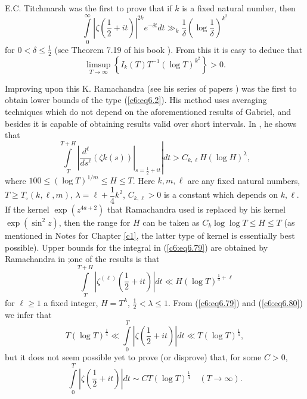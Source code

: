 E.C. Titchmarsh was the first to prove that if $k$ is a fixed natural
number, then 
$$
\int\limits^{\infty}_0 \left|\zeta \left(\frac{1}{2} + it
\right)\right|^{2k} e^{-\delta t} dt \gg_k \frac{1}{\delta} \left(\log
\frac{1}{\delta} \right)^{k^2} 
$$
for $0 < \delta \leq \frac{1}{2}$ (see Theorem 7.19 of his book
\cite{Titchmarsh1}). From this it is easy to deduce that  
$$
\limsup\limits_{T \to \infty} \left\{I_k (T) T^{-1} (\log
T)^{k^2}\right\} > 0. 
$$

Improving upon this K. Ramachandra (see his series of papers
\cite{Ramachandra3}) was the first to obtain lower bounds of the type
(\ref{c6:eq6.2}). His method uses averaging techniques which do not
depend on the aforementioned results of Gabriel, and besides it is
capable of obtaining results valid over short intervals. In \cite[Part
II]{Ramachandra3}, he shows that 
\begin{equation} 
\int\limits^{T+H}_T \left. \left|\frac{d^\ell}{ds^{\ell}}
(\zeta{k}(s)) \right|_{s = \frac{1}{2} +it} \right| dt > C_{k,\ell} H
(\log H)^{\lambda},\label{c6:eq6.79} 
\end{equation}
where $100 \leq (\log T)^{1/m} \leq H \leq T$. Here $k, m,\ell$ are
any fixed natural numbers, $T \geq T_\circ (k,\ell,m)$, $\lambda =
\ell + \dfrac{1}{4} k^2$, $C_{k,\ell} > 0$ is a constant which depends
on $k,\ell$. If the kernel $\exp (z^{4a+2})$ that Ramachandra used  is
replaced by his kernel $\exp (\sin^2 z)$, then the range for $H$ can
be taken as $C_k \log \log T \leq H \leq T$ (as mentioned in Notes for
Chapter \ref{c1}, the latter type of kernel is essentially best
possible). Upper bounds for the integral in (\ref{c6:eq6.79}) are
obtained by Ramachandra in \cite[Part
  III]{Ramachandra3};\pageoriginale one of the results is that 
\begin{equation}
\int\limits^{T+H}_T \left|\zeta^{(\ell)} \left(\frac{1}{2} + it
\right)\right|dt \ll H (\log T)^{\frac{1}{4}+ \ell}
\label{c6:eq6.80} 
\end{equation}
for $\ell \geq 1$ a fixed integer, $H = T^{\lambda}$, $\frac{1}{2} <
\lambda \leq 1$. From (\ref{c6:eq6.79}) and (\ref{c6:eq6.80}) we infer
that 
$$
T(\log T)^{\frac{1}{4}} \ll \int\limits^T_0 \left|\zeta
\left(\frac{1}{2} + it \right)\right|dt\ll T(\log T)^{\frac{1}{4}}, 
$$
but it does not seem possible yet to prove (or disprove) that, for
some $C>0$, 
$$
\int\limits^T_0 \left|\zeta \left(\frac{1}{2} + it \right)\right| dt
\sim CT (\log T)^{\frac{1}{4}} \quad (T \to \infty). 
$$


